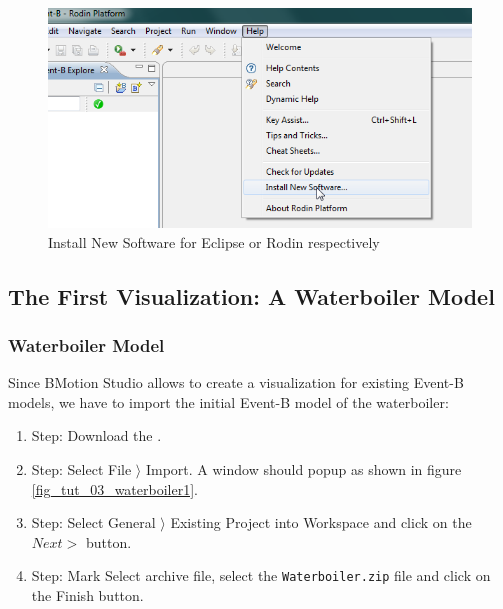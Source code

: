 \begin{figure}[!h]
\begin{center}
	\includegraphics{img/tutorial/tut_02_install1.png}
	\caption{Install New Software for Eclipse or Rodin respectively}
	\label{fig_tut_02_install1}
\end{center}
\end{figure}

\subsection{The First Visualization: A Waterboiler Model}


\subsubsection{Waterboiler Model}

Since BMotion Studio allows to create a visualization for existing Event-B models, we have to import the initial Event-B model of the waterboiler: 

\begin{enumerate}
	\item Step: Download the .
	\item Step: Select \textsf{File $\rangle$ Import}. A window should popup as shown in figure \ref{fig_tut_03_waterboiler1}.
	\item Step: Select \textsf{General $\rangle$ Existing Project into Workspace} and click on the \textsf{$Next >$} button.
	\item Step: Mark \textsf{Select archive file}, select the \texttt{Waterboiler.zip} file and click on the \textsf{Finish} button. 
\end{enumerate}

